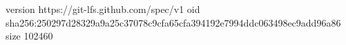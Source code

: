 version https://git-lfs.github.com/spec/v1
oid sha256:250297d28329a9a25c37078c9cfa65cfa394192e7994ddc063498ec9add96a86
size 102460
